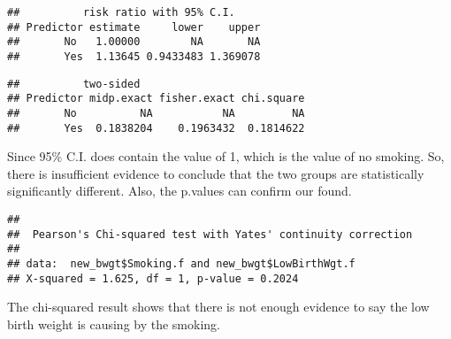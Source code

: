 \documentclass[
]{article}
\newenvironment{Shaded}{\begin{snugshade}}{\end{snugshade}}
\newcommand{\AttributeTok}[1]{\textcolor[rgb]{0.77,0.63,0.00}{#1}}
\newcommand{\CommentTok}[1]{\textcolor[rgb]{0.56,0.35,0.01}{\textit{#1}}}
\newcommand{\FunctionTok}[1]{\textcolor[rgb]{0.00,0.00,0.00}{#1}}
\newcommand{\NormalTok}[1]{#1}
\newcommand{\OtherTok}[1]{\textcolor[rgb]{0.56,0.35,0.01}{#1}}
\newcommand{\SpecialCharTok}[1]{\textcolor[rgb]{0.00,0.00,0.00}{#1}}
\begin{document}
\begin{Shaded}
\end{Shaded}

\begin{verbatim}
##          risk ratio with 95% C.I.
## Predictor estimate     lower    upper
##       No   1.00000        NA       NA
##       Yes  1.13645 0.9433483 1.369078
\end{verbatim}

\begin{Shaded}
\end{Shaded}

\begin{verbatim}
##          two-sided
## Predictor midp.exact fisher.exact chi.square
##       No          NA           NA         NA
##       Yes  0.1838204    0.1963432  0.1814622
\end{verbatim}

Since 95\% C.I. does contain the value of 1, which is the value of no
smoking. So, there is insufficient evidence to conclude that the two
groups are statistically significantly different. Also, the p.values can
confirm our found.

\begin{Shaded}
\end{Shaded}

\begin{verbatim}
## 
##  Pearson's Chi-squared test with Yates' continuity correction
## 
## data:  new_bwgt$Smoking.f and new_bwgt$LowBirthWgt.f
## X-squared = 1.625, df = 1, p-value = 0.2024
\end{verbatim}

The chi-squared result shows that there is not enough evidence to say
the low birth weight is causing by the smoking.
\end{document}
